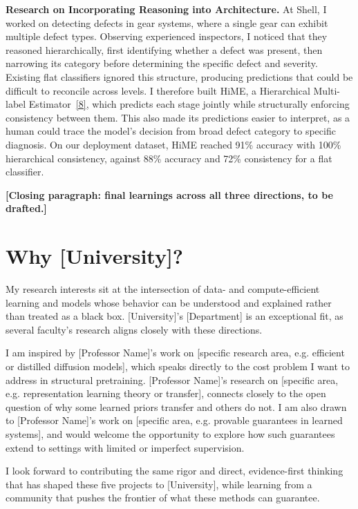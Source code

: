 \documentclass[11pt]{article}
\begin{document}
\vspace{8pt}

\textbf{Research on Incorporating Reasoning into Architecture.} At Shell, I worked on detecting defects in gear systems, where a single gear can exhibit multiple defect types. Observing experienced inspectors, I noticed that they reasoned hierarchically, first identifying whether a defect was present, then narrowing its category before determining the specific defect and severity. Existing flat classifiers ignored this structure, producing predictions that could be difficult to reconcile across levels. I therefore built HiME, a Hierarchical Multi-label Estimator~\hyperref[ref8]{[8]}, which predicts each stage jointly while structurally enforcing consistency between them. This also made its predictions easier to interpret, as a human could trace the model's decision from broad defect category to specific diagnosis. On our deployment dataset, HiME reached 91\% accuracy with 100\% hierarchical consistency, against 88\% accuracy and 72\% consistency for a flat classifier.


\textbf{[Closing paragraph: final learnings across all three directions, to be drafted.]}

\section*{Why [University]?}

My research interests sit at the intersection of data- and compute-efficient learning and models whose behavior can be understood and explained rather than treated as a black box. [University]'s [Department] is an exceptional fit, as several faculty's research aligns closely with these directions.

I am inspired by [Professor Name]'s work on [specific research area, e.g. efficient or distilled diffusion models], which speaks directly to the cost problem I want to address in structural pretraining. [Professor Name]'s research on [specific area, e.g. representation learning theory or transfer], connects closely to the open question of why some learned priors transfer and others do not. I am also drawn to [Professor Name]'s work on [specific area, e.g. provable guarantees in learned systems], and would welcome the opportunity to explore how such guarantees extend to settings with limited or imperfect supervision.

I look forward to contributing the same rigor and direct, evidence-first thinking that has shaped these five projects to [University], while learning from a community that pushes the frontier of what these methods can guarantee.
\end{document}
